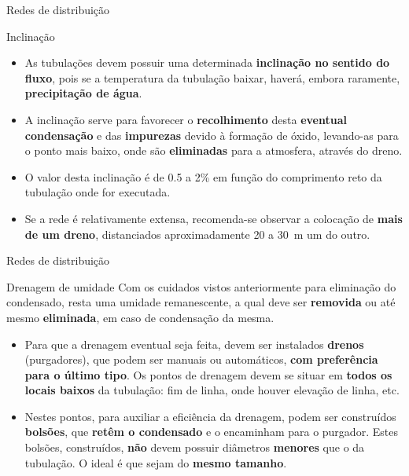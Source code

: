 \begin{frame}{Redes de distribuição}
	\begin{block}{Inclinação}
	\begin{itemize}
		\item As tubulações devem possuir uma determinada \textbf{inclinação no sentido do fluxo}, pois se a temperatura da tubulação baixar, haverá, embora raramente, \textbf{precipitação de água}.
		\item A inclinação serve para favorecer o \textbf{recolhimento} desta \textbf{eventual condensação} e das \textbf{impurezas} devido à formação de óxido, levando-as para o ponto mais baixo, onde são \textbf{eliminadas} para a atmosfera, através do dreno.
		\item O valor desta inclinação é de \num{0.5} a 2\% em função do comprimento reto da tubulação onde for executada.
		\item Se a rede é relativamente extensa, recomenda-se observar a colocação de \textbf{mais de um dreno}, distanciados aproximadamente 20 a \SI{30}{\meter} um do outro.
	\end{itemize}
	\end{block}
\end{frame}


\begin{frame}{Redes de distribuição}
	\begin{block}{Drenagem de umidade}
		Com os cuidados vistos anteriormente para eliminação do condensado, resta uma umidade remanescente, a qual deve ser \textbf{removida} ou até mesmo \textbf{eliminada}, em caso de condensação da mesma.

		\begin{itemize}
			\item Para que a drenagem eventual seja feita, devem ser instalados \textbf{drenos} (purgadores), que podem ser manuais ou automáticos, \textbf{com preferência para o último tipo}. Os pontos de drenagem devem se situar em \textbf{todos os locais baixos} da tubulação: fim de linha, onde houver elevação de linha, etc.
			\item Nestes pontos, para auxiliar a eficiência da drenagem, podem ser construídos \textbf{bolsões}, que \textbf{retêm o condensado} e o encaminham para o purgador. Estes bolsões, construídos, \textbf{não} devem possuir diâmetros \textbf{menores} que o da tubulação. O ideal é que sejam do \textbf{mesmo tamanho}.
		\end{itemize}
	\end{block}

\end{frame}


